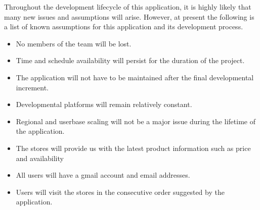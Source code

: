 %
%
%
%
Throughout the development lifecycle of this application, it is highly likely that many new issues and assumptions will arise.  
However, at present the following is a list of known assumptions for this application and its development process.

\begin{itemize}
  \item No members of the team will be lost.
  \item Time and schedule availability will persist for the duration of the project.
  \item The application will not have to be maintained after the final developmental increment.
  \item Developmental platforms will remain relatively constant.
  \item Regional and userbase scaling will not be a major issue during the lifetime of the application.
  \item  The stores will provide us with the latest product information such as price and availability
  \item All users will have a gmail account and email addresses.
  \item Users will visit the stores in the consecutive order suggested by the application.
\end{itemize}